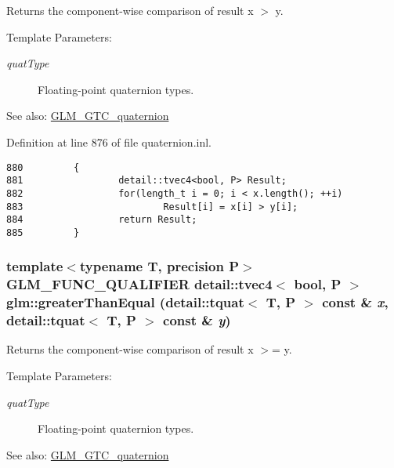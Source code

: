 Returns the component-wise comparison of result x $>$ y.

\begin{Desc}
\item[Template Parameters:]
\begin{description}
\item[{\em quatType}]Floating-point quaternion types.\end{description}
\end{Desc}
\begin{Desc}
\item[See also:]\hyperlink{group__gtc__quaternion}{GLM\_\-GTC\_\-quaternion} \end{Desc}


Definition at line 876 of file quaternion.inl.

\begin{Code}\begin{verbatim}880         {
881                 detail::tvec4<bool, P> Result;
882                 for(length_t i = 0; i < x.length(); ++i)
883                         Result[i] = x[i] > y[i];
884                 return Result;
885         }
\end{verbatim}
\end{Code}


\hypertarget{group__gtc__quaternion_ge52fe15caa6daaf39c02a5d5827f8473}{
\subsubsection[greaterThanEqual]{\setlength{\rightskip}{0pt plus 5cm}template$<$typename T, precision P$>$ GLM\_\-FUNC\_\-QUALIFIER detail::tvec4$<$ bool, P $>$ glm::greaterThanEqual (detail::tquat$<$ T, P $>$ const \& {\em x}, \/  detail::tquat$<$ T, P $>$ const \& {\em y})}}
\label{group__gtc__quaternion_ge52fe15caa6daaf39c02a5d5827f8473}


Returns the component-wise comparison of result x $>$= y.

\begin{Desc}
\item[Template Parameters:]
\begin{description}
\item[{\em quatType}]Floating-point quaternion types.\end{description}
\end{Desc}
\begin{Desc}
\item[See also:]\hyperlink{group__gtc__quaternion}{GLM\_\-GTC\_\-quaternion} \end{Desc}


